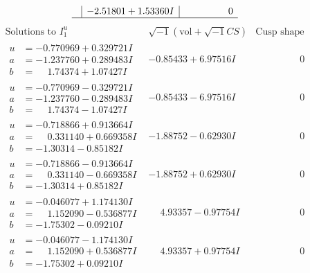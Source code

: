\documentclass[1p]{elsarticle_modified}
\theoremstyle{definition}
\newcommand{\I}{\sqrt{-1}}
\begin{document}
$$\begin{array}{c|c|c}
 & -2.51801 + 1.53360 I & \phantom{-0.000000 } 0\\
 \hline 
 \end{array}$$\newpage$$\begin{array}{c|c|c}  
\text{Solutions to }I^u_{1}& \I (\text{vol} + \sqrt{-1}CS) & \text{Cusp shape}\\
 \hline 
\begin{aligned}
u &= -0.770969 + 0.329721 I \\
a &= -1.237760 + 0.289483 I \\
b &= \phantom{-}1.74374 + 1.07427 I\end{aligned}
 & -0.85433 + 6.97516 I & \phantom{-0.000000 } 0 \\ \hline\begin{aligned}
u &= -0.770969 - 0.329721 I \\
a &= -1.237760 - 0.289483 I \\
b &= \phantom{-}1.74374 - 1.07427 I\end{aligned}
 & -0.85433 - 6.97516 I & \phantom{-0.000000 } 0 \\ \hline\begin{aligned}
u &= -0.718866 + 0.913664 I \\
a &= \phantom{-}0.331140 + 0.669358 I \\
b &= -1.30314 - 0.85182 I\end{aligned}
 & -1.88752 - 0.62930 I & \phantom{-0.000000 } 0 \\ \hline\begin{aligned}
u &= -0.718866 - 0.913664 I \\
a &= \phantom{-}0.331140 - 0.669358 I \\
b &= -1.30314 + 0.85182 I\end{aligned}
 & -1.88752 + 0.62930 I & \phantom{-0.000000 } 0 \\ \hline\begin{aligned}
u &= -0.046077 + 1.174130 I \\
a &= \phantom{-}1.152090 - 0.536877 I \\
b &= -1.75302 - 0.09210 I\end{aligned}
 & \phantom{-}4.93357 - 0.97754 I & \phantom{-0.000000 } 0 \\ \hline\begin{aligned}
u &= -0.046077 - 1.174130 I \\
a &= \phantom{-}1.152090 + 0.536877 I \\
b &= -1.75302 + 0.09210 I\end{aligned}
 & \phantom{-}4.93357 + 0.97754 I & \phantom{-0.000000 } 0 \\ \hline\begin{aligned}

\end{aligned}
\end{array}$$
\end{document}
